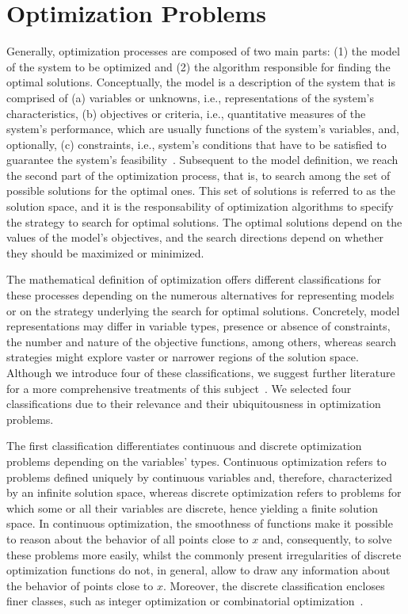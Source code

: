 \section{Optimization Problems}
	Generally, optimization processes are composed of two main parts: (1) the model of the system to be optimized and (2) the algorithm responsible for finding the optimal solutions. Conceptually, the model is a description of the system that is comprised of (a) variables or unknowns, i.e., representations of the system's characteristics, (b) objectives or criteria, i.e., quantitative measures of the system's performance, which are usually functions of the system's variables, and, optionally, (c) constraints, i.e., system's conditions that have to be satisfied to guarantee the system's feasibility~\cite{Nocedal2011NumericalOptimization}. Subsequent to the model definition, we reach the second part of the optimization process, that is, to search among the set of possible solutions for the optimal ones. This set of solutions is referred to as the solution space, and it is the responsability of optimization algorithms to specify the strategy to search for optimal solutions. The optimal solutions depend on the values of the model's objectives, and the search directions depend on whether they should be maximized or minimized. 
	
	
	The mathematical definition of optimization offers different classifications for these processes depending on the numerous alternatives for representing models or on the strategy underlying the search for optimal solutions. Concretely, model representations may differ in variable types, presence or absence of constraints, the number and nature of the objective functions, among others, whereas search strategies might explore vaster or narrower regions of the solution space. Although we introduce four of these classifications, we suggest further literature for a more comprehensive treatments of this subject~\cite{Nocedal2011NumericalOptimization,Nemhauser1988}. We selected four classifications due to their relevance and their ubiquitousness in optimization problems.
	
	The first classification differentiates continuous and discrete optimization problems depending on the variables' types. Continuous optimization refers to problems defined uniquely by continuous variables and, therefore, characterized by an infinite solution space, whereas discrete optimization refers to problems for which some or all their variables are discrete, hence yielding a finite solution space. In continuous optimization, the smoothness of functions make it possible to reason about the behavior of all points close to $x$ and, consequently, to solve these problems more easily, whilst the commonly present irregularities of discrete optimization functions do not, in general, allow to draw any information about the behavior of points close to $x$. Moreover, the discrete classification encloses finer classes, such as integer optimization or combinatorial optimization~\cite{Nemhauser1988}. 
	
